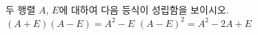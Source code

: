 \hspace*{2mm}\begin{minipage}[t]{\dimexpr\linewidth-2mm\relax}\vspace{0pt}
두 행렬 $A$, $E$에 대하여 다음 등식이 성립함을 보이시오.
 $(A+E)(A-E)=A^2-E$
 $(A-E)^2=A^2-2A+E$\end{minipage}
